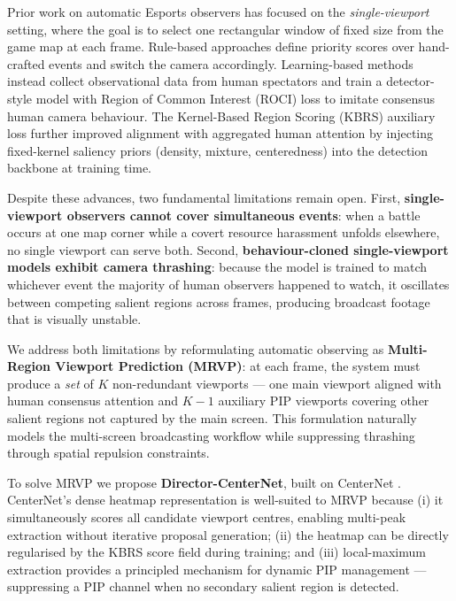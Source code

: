 \documentclass[preprint,12pt]{elsarticle}
\begin{document}
Prior work on automatic Esports observers has focused on the 
\emph{single-viewport} setting, where the goal is to select one rectangular 
window of fixed size from the game map at each frame. Rule-based approaches 
\cite{mattsson2015automatic} define priority scores over hand-crafted events 
and switch the camera accordingly. Learning-based methods 
\cite{joo2023learning} instead collect observational data from human 
spectators and train a detector-style model with Region of Common Interest 
(ROCI) loss to imitate consensus human camera behaviour. The Kernel-Based 
Region Scoring (KBRS) auxiliary loss \cite{anonymous2025kbrs} further improved 
alignment with aggregated human attention by injecting fixed-kernel saliency 
priors (density, mixture, centeredness) into the detection backbone at 
training time.

Despite these advances, two fundamental limitations remain open. First, 
\textbf{single-viewport observers cannot cover simultaneous events}: when a 
battle occurs at one map corner while a covert resource harassment unfolds 
elsewhere, no single viewport can serve both. Second, 
\textbf{behaviour-cloned single-viewport models exhibit camera thrashing}: 
because the model is trained to match whichever event the majority of human 
observers happened to watch, it oscillates between competing salient regions 
across frames, producing broadcast footage that is visually unstable.

We address both limitations by reformulating automatic observing as 
\textbf{Multi-Region Viewport Prediction (MRVP)}: at each frame, the system 
must produce a \emph{set} of $K$ non-redundant viewports — one main viewport 
aligned with human consensus attention and $K-1$ auxiliary PIP viewports 
covering other salient regions not captured by the main screen. This 
formulation naturally models the multi-screen broadcasting workflow while 
suppressing thrashing through spatial repulsion constraints.

To solve MRVP we propose \textbf{Director-CenterNet}, built on CenterNet 
\cite{zhou2019objects}. CenterNet's dense heatmap representation is 
well-suited to MRVP because (i) it simultaneously scores all candidate 
viewport centres, enabling multi-peak extraction without iterative proposal 
generation; (ii) the heatmap can be directly regularised by the KBRS score 
field during training; and (iii) local-maximum extraction provides a 
principled mechanism for dynamic PIP management — suppressing a PIP channel 
when no secondary salient region is detected.
\end{document}
